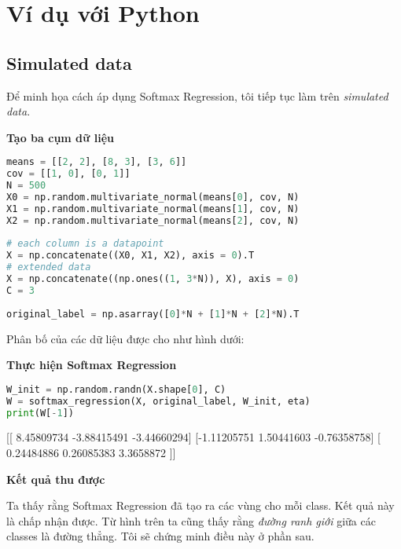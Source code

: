  
\section{Ví dụ với Python}
 
\subsection{Simulated data}
Để minh họa cách áp dụng Softmax Regression, tôi tiếp tục làm trên \textit{simulated data}.  
 
\textbf{Tạo ba cụm dữ liệu} 
\begin{lstlisting}[language=Python]
means = [[2, 2], [8, 3], [3, 6]] 
cov = [[1, 0], [0, 1]] 
N = 500 
X0 = np.random.multivariate_normal(means[0], cov, N) 
X1 = np.random.multivariate_normal(means[1], cov, N) 
X2 = np.random.multivariate_normal(means[2], cov, N) 
 
# each column is a datapoint 
X = np.concatenate((X0, X1, X2), axis = 0).T  
# extended data 
X = np.concatenate((np.ones((1, 3*N)), X), axis = 0) 
C = 3 
 
original_label = np.asarray([0]*N + [1]*N + [2]*N).T 
\end{lstlisting}
Phân bố của các dữ liệu được cho như hình dưới: 
 
 
\textbf{Thực hiện Softmax Regression} 
 
\begin{lstlisting}[language=Python]
W_init = np.random.randn(X.shape[0], C) 
W = softmax_regression(X, original_label, W_init, eta) 
print(W[-1]) 
\end{lstlisting}
 
    [[ 8.45809734 -3.88415491 -3.44660294] 
     [-1.11205751  1.50441603 -0.76358758] 
     [ 0.24484886  0.26085383  3.3658872 ]] 
 
\textbf{Kết quả thu được} 
 
 
Ta thấy rằng Softmax Regression đã tạo ra các vùng cho mỗi class. Kết quả này là chấp nhận được. Từ hình trên ta cũng thấy rằng \textit{đường ranh giới} giữa các classes là đường thẳng. Tôi sẽ chứng minh điều này ở phần sau.  
 
